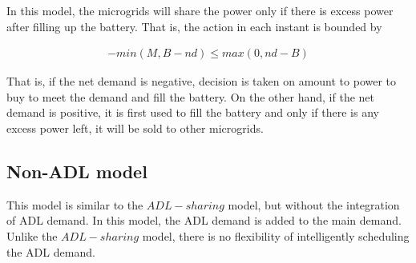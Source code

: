 In this model, the microgrids will share the power only if there is excess power after filling up the battery. That is, the action in each instant is bounded by   

\begin{align}
-min(M, B - nd) \leq max(0,nd - B) 
\end{align}

That is, if the net demand is negative, decision is taken on amount to power to buy to meet the demand and fill the battery. On the other hand, if the net demand is positive, it is first used to fill the battery and only if there is any excess power left, it will be sold to other microgrids. 

\subsection{Non-ADL model}

This model is similar to the $ADL-sharing$ model, but without the integration of ADL demand. In this model, the ADL demand is added to the main demand. Unlike the $ADL-sharing$ model, there is no flexibility of intelligently scheduling the ADL demand. 
